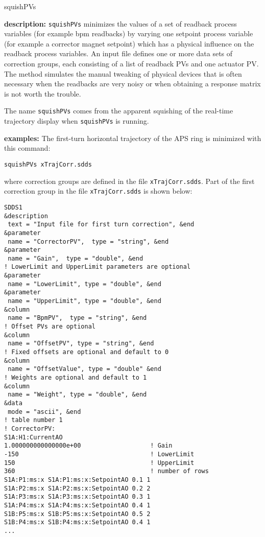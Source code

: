 \begin{sddsprog}{squishPVs}
\item \textbf{description:}
\verb+squishPVs+ minimizes the values of a set of readback process
variables (for example bpm readbacks) by varying one setpoint process
variable (for example a corrector magnet setpoint) which has
a physical influence on the readback process variables.
An input file defines one or more data sets of correction groups, each
consisting of a list of readback PVs and one actuator PV.
The method simulates the manual tweaking of physical devices that is often necessary
when the readbacks are very noisy or when obtaining a response matrix is not
worth the trouble.

The name \verb+squishPVs+ comes from the apparent squishing of the real-time
trajectory display when \verb+squishPVs+ is running.
\item \textbf{examples:}
%
The first-turn horizontal trajectory of the APS ring is minimized with this command:
\begin{verbatim}
squishPVs xTrajCorr.sdds
\end{verbatim}
where correction groups are defined in the file \verb+xTrajCorr.sdds+.
Part of the first correction group in the file \verb+xTrajCorr.sdds+
is shown below:
\begin{verbatim}
SDDS1
&description
 text = "Input file for first turn correction", &end
&parameter
 name = "CorrectorPV",  type = "string", &end
&parameter
 name = "Gain",  type = "double", &end
! LowerLimit and UpperLimit parameters are optional
&parameter
 name = "LowerLimit", type = "double", &end
&parameter
 name = "UpperLimit", type = "double", &end
&column
 name = "BpmPV",  type = "string", &end
! Offset PVs are optional
&column
 name = "OffsetPV", type = "string", &end
! Fixed offsets are optional and default to 0
&column
 name = "OffsetValue", type = "double" &end
! Weights are optional and default to 1
&column
 name = "Weight", type = "double", &end
&data
 mode = "ascii", &end
! table number 1
! CorrectorPV:
S1A:H1:CurrentAO
1.000000000000000e+00                   ! Gain
-150                                    ! LowerLimit
150                                     ! UpperLimit
360                                     ! number of rows
S1A:P1:ms:x S1A:P1:ms:x:SetpointAO 0.1 1
S1A:P2:ms:x S1A:P2:ms:x:SetpointAO 0.2 2
S1A:P3:ms:x S1A:P3:ms:x:SetpointAO 0.3 1
S1A:P4:ms:x S1A:P4:ms:x:SetpointAO 0.4 1
S1B:P5:ms:x S1B:P5:ms:x:SetpointAO 0.5 2
S1B:P4:ms:x S1B:P4:ms:x:SetpointAO 0.4 1
...
\end{verbatim}



\end{sddsprog}

